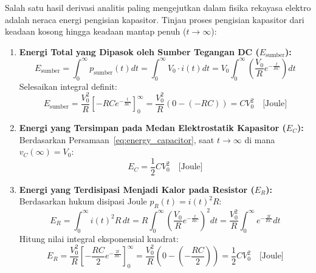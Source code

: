 \documentclass[11pt,a4paper]{article}
\theoremstyle{definition}
\begin{document}
Salah satu hasil derivasi analitis paling mengejutkan dalam fisika rekayasa elektro adalah neraca energi pengisian kapasitor. Tinjau proses pengisian kapasitor dari keadaan kosong hingga keadaan mantap penuh ($t \to \infty$):
\begin{enumerate}[leftmargin=*]
    \item \textbf{Energi Total yang Dipasok oleh Sumber Tegangan DC ($E_{\text{sumber}}$):}
    \begin{equation}
        E_{\text{sumber}} = \int_0^\infty p_{\text{sumber}}(t) dt = \int_0^\infty V_0 \cdot i(t) dt = V_0 \int_0^\infty \left( \frac{V_0}{R} e^{-\frac{t}{RC}} \right) dt
    \end{equation}
    Selesaikan integral definit:
    \begin{equation}
        E_{\text{sumber}} = \frac{V_0^2}{R} \left[ -RC e^{-\frac{t}{RC}} \right]_0^\infty = \frac{V_0^2}{R} \left( 0 - (-RC) \right) = C V_0^2 \quad \text{[Joule]}
        \label{eq:energy_source_proof}
    \end{equation}
    \item \textbf{Energi yang Tersimpan pada Medan Elektrostatik Kapasitor ($E_C$):}
    Berdasarkan Persamaan~\eqref{eq:energy_capacitor}, saat $t \to \infty$ di mana $v_C(\infty) = V_0$:
    \begin{equation}
        E_C = \frac{1}{2} C V_0^2 \quad \text{[Joule]}
        \label{eq:energy_cap_proof}
    \end{equation}
    \item \textbf{Energi yang Terdisipasi Menjadi Kalor pada Resistor ($E_R$):}
    Berdasarkan hukum disipasi Joule $p_R(t) = i(t)^2 R$:
    \begin{equation}
        E_R = \int_0^\infty i(t)^2 R \, dt = R \int_0^\infty \left( \frac{V_0}{R} e^{-\frac{t}{RC}} \right)^2 dt = \frac{V_0^2}{R} \int_0^\infty e^{-\frac{2t}{RC}} dt
    \end{equation}
    Hitung nilai integral eksponensial kuadrat:
    \begin{equation}
        E_R = \frac{V_0^2}{R} \left[ -\frac{RC}{2} e^{-\frac{2t}{RC}} \right]_0^\infty = \frac{V_0^2}{R} \left( 0 - \left( -\frac{RC}{2} \right) \right) = \frac{1}{2} C V_0^2 \quad \text{[Joule]}
        \label{eq:energy_resistor_proof}
    \end{equation}
\end{enumerate}
\end{document}
